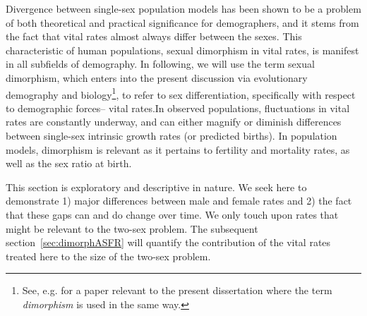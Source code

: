  \FloatBarrier
Divergence between single-sex population models has been shown to be a problem
of both theoretical and practical significance for demographers, and it stems from
the fact that vital rates almost always differ between the sexes.
This characteristic of human populations, sexual dimorphism in vital rates,
is manifest in all subfields of demography. In following, we will use the term
sexual dimorphism, which enters into the present discussion via evolutionary
demography and biology\footnote{See, e.g. \citet{caswell1986two} for a paper
relevant to the present dissertation where the term \textit{dimorphism} is used
in the same way.}, to refer to sex differentiation, specifically with respect to demographic forces-- vital rates.In observed populations, fluctuations in vital rates are constantly underway, and can either magnify or 
diminish differences between single-sex intrinsic growth rates (or predicted births). 
In population models, dimorphism is relevant as it pertains to fertility and mortality 
rates, as well as the sex ratio at birth.

This section is exploratory and descriptive in nature. We seek here to
demonstrate 1) major differences between male and female rates and 2) the fact
that these gaps can and do change over time. We only touch upon rates that might
be relevant to the two-sex problem. The subsequent section~\ref{sec:dimorphASFR}
will quantify the contribution of the vital rates treated here to the size of the two-sex
problem.
